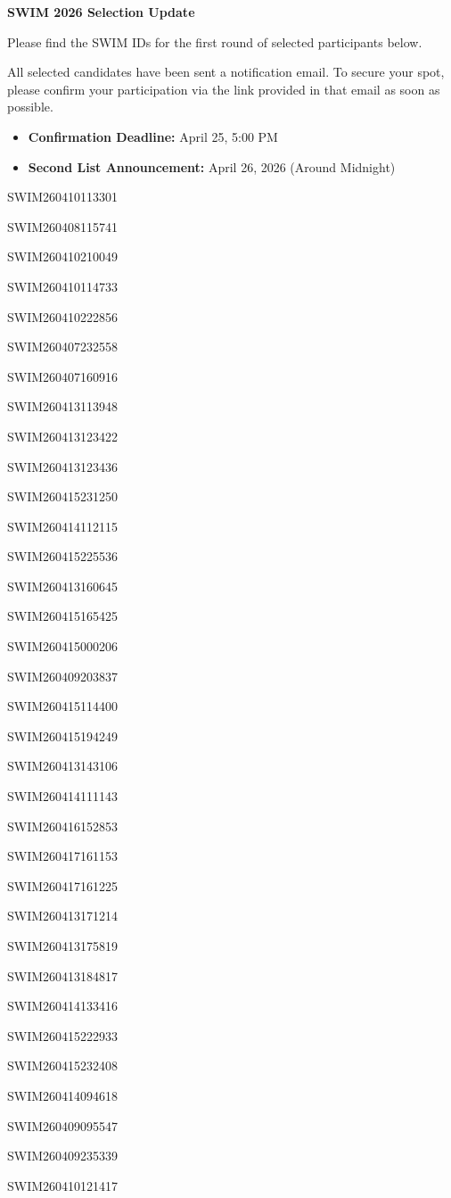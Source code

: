 \documentclass[12pt]{letter}
\begin{document}
\textbf{\large SWIM 2026 Selection Update}

Please find the SWIM IDs for the first round of selected participants below.

All selected candidates have been sent a notification email. To secure your spot, please confirm your participation via the link provided in that email as soon as possible.

\begin{itemize}
    \item \textbf{Confirmation Deadline:} April 25, 5:00 PM
    \item \textbf{Second List Announcement:} April 26, 2026 (Around Midnight)
\end{itemize}

\bigskip
\begin{minipage}{0.5\textwidth}

    SWIM260410113301

    SWIM260408115741

    SWIM260410210049

    SWIM260410114733

    SWIM260410222856

    SWIM260407232558

    SWIM260407160916

    SWIM260413113948

    SWIM260413123422

    SWIM260413123436

    SWIM260415231250

    SWIM260414112115

    SWIM260415225536

    SWIM260413160645

    SWIM260415165425

    SWIM260415000206

    SWIM260409203837


\end{minipage}%
\begin{minipage}{0.5\textwidth}

    SWIM260415114400

    SWIM260415194249

    SWIM260413143106

    SWIM260414111143

    SWIM260416152853

    SWIM260417161153

    SWIM260417161225

    SWIM260413171214

    SWIM260413175819

    SWIM260413184817

    SWIM260414133416

    SWIM260415222933

    SWIM260415232408

    SWIM260414094618

    SWIM260409095547

    SWIM260409235339

    SWIM260410121417
\end{minipage}
\end{document}
